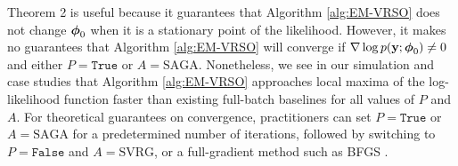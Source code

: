 Theorem 2 is useful because it guarantees that Algorithm \ref{alg:EM-VRSO} does not change $\boldsymbol{\phi}_0$ when it is a stationary point of the likelihood. However, it makes no guarantees that Algorithm \ref{alg:EM-VRSO} will converge if $\nabla \log p(\mathbf{y};\boldsymbol{\phi}_0) \neq 0$ and either $P = \texttt{True}$ or $A = \text{SAGA}$. Nonetheless, we see in our simulation and case studies that Algorithm \ref{alg:EM-VRSO} approaches local maxima of the log-likelihood function faster than existing full-batch baselines for all values of $P$ and $A$. For theoretical guarantees on convergence, practitioners can set $P = \texttt{True}$ or $A = \text{SAGA}$ for a predetermined number of iterations, followed by switching to $P = \texttt{False}$ and $A = \text{SVRG}$, or a full-gradient method such as BFGS \citep{Fletcher:2000}.





